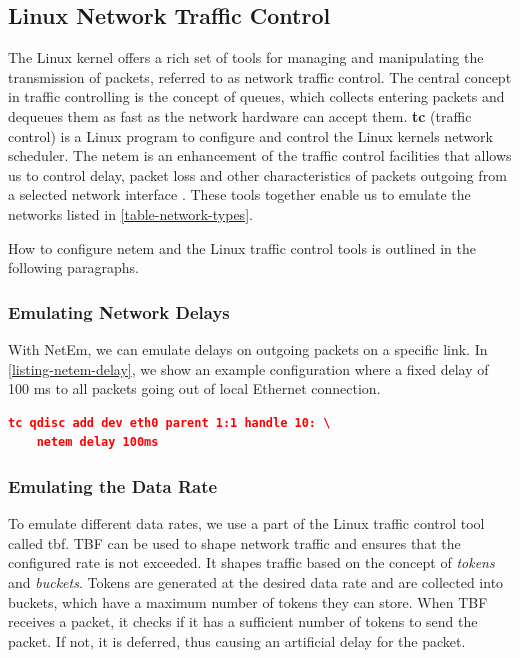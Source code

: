 \subsection{Linux Network Traffic Control}

The Linux kernel offers a rich set of tools for managing and manipulating the
transmission of packets, referred to as network traffic control. The central
concept in traffic controlling is the concept of queues, which collects entering
packets and dequeues them as fast as the network hardware can accept them.
\textbf{tc} (traffic control) is a Linux program to configure and control the
Linux kernels network scheduler. The \gls{netem} is an enhancement of the
traffic control facilities that allows us to control delay, packet loss and
other characteristics of packets outgoing from a selected network interface
\cite{man-netem}. These tools together enable us to emulate the networks listed
in \cref{table-network-types}.

How to configure \gls{netem} and the Linux traffic control tools is outlined in
the following paragraphs.

\subsubsection{Emulating Network Delays}

With NetEm, we can emulate delays on outgoing packets on a specific link. In
\cref{listing-netem-delay}, we show an example configuration where a fixed delay
of 100 ms to all packets going out of local Ethernet connection.

\begin{lstlisting}[frame=single, language=json, caption="Emulating the delay of outgoing packets", label=listing-netem-delay]
  tc qdisc add dev eth0 parent 1:1 handle 10: \
    netem delay 100ms
\end{lstlisting}

\subsubsection{Emulating the Data Rate}

To emulate different data rates, we use a part of the Linux traffic control tool
called \gls{tbf}. TBF can be used to shape network traffic and ensures that the
configured rate is not exceeded. It shapes traffic based on the concept of
\textit{tokens} and \textit{buckets}. Tokens are generated at the desired data
rate and are collected into buckets, which have a maximum number of tokens they
can store. When TBF receives a packet, it checks if it has a sufficient number
of tokens to send the packet. If not, it is deferred, thus causing an artificial
delay for the packet.

